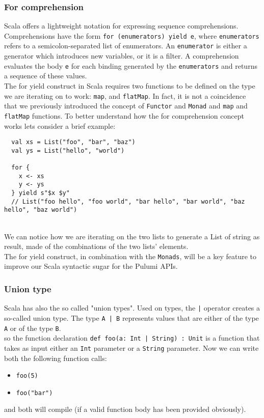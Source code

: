       

\subsubsection{For comprehension}
Scala offers a lightweight notation for expressing \gls{sequence comprehension}s.
Comprehensions have the form \texttt{for (enumerators) yield e}, where \texttt{enumerators} refers to a semicolon-separated list of enumerators.
An \texttt{enumerator} is either a generator which introduces new variables, or it is a filter.
A comprehension evaluates the body \texttt{e} for each binding generated by the \texttt{enumerators} and returns a sequence of these values.\\
The for yield construct in Scala requires two functions to be defined on the type we are iterating on to work: \texttt{map}, and \texttt{flatMap}.
In fact, it is not a coincidence that we previously introduced the concept of \texttt{Functor} and \texttt{Monad} and \texttt{map} and \texttt{flatMap} functions.
To better understand how the for comprehension concept works lets consider a brief example:
\begin{verbatim}
  val xs = List("foo", "bar", "baz")
  val ys = List("hello", "world")

  for {
    x <- xs
    y <- ys
  } yield s"$x $y"
  // List("foo hello", "foo world", "bar hello", "bar world", "baz hello", "baz world")
\end{verbatim}\mbox{}\\
We can notice how we are iterating on the two lists to generate a List of string as result, made of the combinations of the two lists' elements.\\
The for yield construct, in combination with the \texttt{Monads}, will be a key feature to improve our Scala syntactic sugar for the Pulumi APIs.

\subsubsection{Union type}
\label{sssec:union}
Scala has also the so called "union types".
Used on types, the \texttt{|} operator creates a so-called union type. The type \texttt{A | B} represents values that are either of the type \texttt{A} or of the type \texttt{B}.\\
so the function declaration \texttt{def foo(a: Int | String)  : Unit} is a function that takes as input either an \texttt{Int} parameter or a \texttt{String} parameter.
Now we can write both the following function calls:
\begin{itemize}
  \item \texttt{foo(5)}
  \item \texttt{foo("bar")}
\end{itemize}
and both will compile (if a valid function body has been provided obviously).


